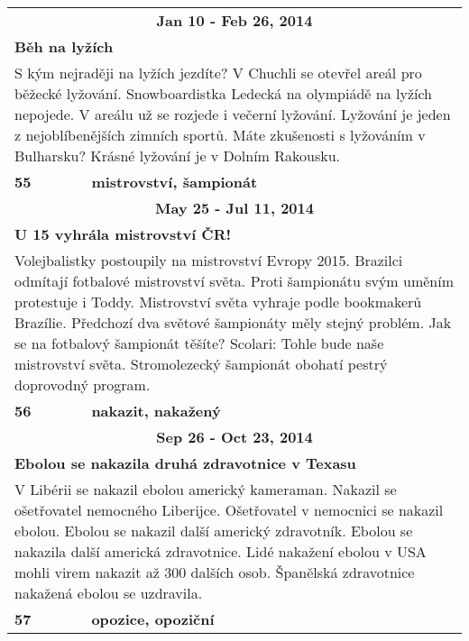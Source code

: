 \begin{tabularx}{\linewidth}{l l}
                \multicolumn{2}{c}{\bf Jan 10 - Feb 26, 2014} \\
                \multicolumn{2}{p{\linewidth}}{\bf Běh na lyžích} \\
                \multicolumn{2}{p{\linewidth}}{S kým nejraději na lyžích jezdíte? V Chuchli se otevřel areál pro běžecké lyžování. Snowboardistka Ledecká na olympiádě na lyžích nepojede. V areálu už se rozjede i večerní lyžování. Lyžování je jeden z nejoblíbenějších zimních sportů. Máte zkušenosti s lyžováním v Bulharsku? Krásné lyžování je v Dolním Rakousku.} \\ \midrule
                [1.5pt]

            \bf 55 & \bf mistrovství, šampionát \\ \midrule
            
                \multicolumn{2}{c}{\bf May 25 - Jul 11, 2014} \\
                \multicolumn{2}{p{\linewidth}}{\bf U 15 vyhrála mistrovství ČR!} \\
                \multicolumn{2}{p{\linewidth}}{Volejbalistky postoupily na mistrovství Evropy 2015. Brazilci odmítají fotbalové mistrovství světa. Proti šampionátu svým uměním protestuje i Toddy. Mistrovství světa vyhraje podle bookmakerů Brazílie. Předchozí dva světové šampionáty měly stejný problém. Jak se na fotbalový šampionát těšíte? Scolari: Tohle bude naše mistrovství světa. Stromolezecký šampionát obohatí pestrý doprovodný program.} \\ \midrule
                [1.5pt]

            \bf 56 & \bf nakazit, nakažený \\ \midrule
            
                \multicolumn{2}{c}{\bf Sep 26 - Oct 23, 2014} \\
                \multicolumn{2}{p{\linewidth}}{\bf Ebolou se nakazila druhá zdravotnice v Texasu} \\
                \multicolumn{2}{p{\linewidth}}{V Libérii se nakazil ebolou americký kameraman. Nakazil se ošetřovatel nemocného Liberijce. Ošetřovatel v nemocnici se nakazil ebolou. Ebolou se nakazil další americký zdravotník. Ebolou se nakazila další americká zdravotnice. Lidé nakažení ebolou v USA mohli virem nakazit až 300 dalších osob. Španělská zdravotnice nakažená ebolou se uzdravila.} \\ \midrule
                [1.5pt]

            \bf 57 & \bf opozice, opoziční \\ \midrule
            

\end{tabularx}
